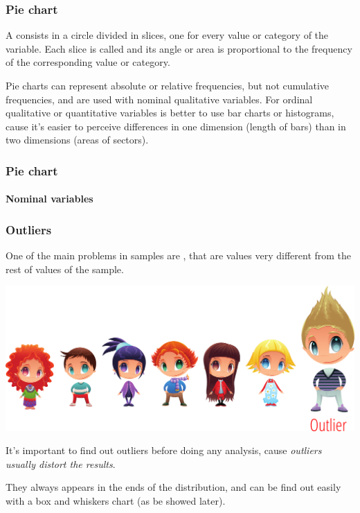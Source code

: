 \begin{frame}
\frametitle{Pie chart}
A  consists in a circle divided in slices, one for every value or category of the variable. 
Each slice is called  and its angle or area is proportional to the frequency of the corresponding
value or category. 

Pie charts can represent absolute or relative frequencies, but not cumulative frequencies, and are used with nominal
qualitative variables.
For ordinal qualitative or quantitative variables is better to use bar charts or histograms, cause it's easier to
perceive differences in one dimension (length of bars) than in two dimensions (areas of sectors).
\end{frame}


\begin{frame}
\frametitle{Pie chart}
\framesubtitle{Nominal variables}
\begin{center}
\scalebox{0.6}{}
\end{center}
\end{frame}


\begin{frame}
\frametitle{Outliers}
One of the main problems in samples are , that are values very different from the rest of
values of the sample.
\begin{center}
\includegraphics[scale=0.5]{img/descriptive/outlier.png}
\end{center}

It's important to find out outliers before doing any analysis, cause \alert{\emph{outliers usually distort the
results}}.

They always appears in the ends of the distribution, and can be find out easily with a box and whiskers chart (as 
be showed later).
\end{frame}



